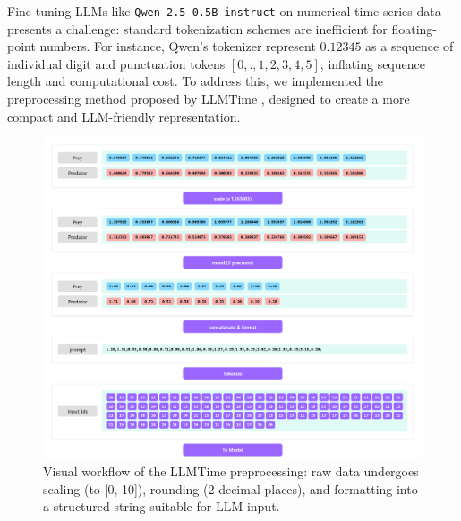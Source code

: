 \documentclass{article}
\begin{document}
Fine-tuning LLMs like \texttt{Qwen-2.5-0.5B-instruct} on numerical time-series data presents a challenge: standard tokenization schemes are inefficient for floating-point numbers. For instance, Qwen's tokenizer represent $0.12345$ as a sequence of individual digit and punctuation tokens $[0, ., 1, 2, 3, 4, 5]$, inflating sequence length and computational cost. To address this, we implemented the preprocessing method proposed by LLMTime \cite{gruver2024largelanguagemodelszeroshot}, designed to create a more compact and LLM-friendly representation.

\begin{figure}[!h]
    \centering
    \includegraphics[width=\linewidth]{M2 Course Work/Images/preprocess_vis.png}
    \caption{Visual workflow of the LLMTime preprocessing: raw data undergoes scaling (to [0, 10]), rounding (2 decimal places), and formatting into a structured string suitable for LLM input.}
    \label{fig:preprocessing_visual_workflow}
\end{figure}
\end{document}
